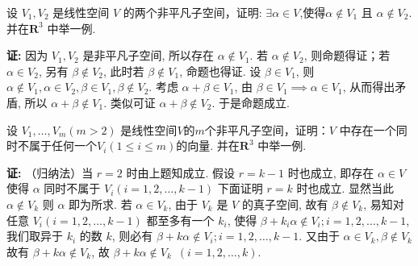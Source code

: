 \begin{exercise}
\begin{exgroup}
        \item 设 $V_1,V_2$ 是线性空间 $V$ 的两个非平凡子空间，证明: $\exists \alpha \in V$,使得$\alpha \notin V_1$ 且 $\alpha \notin V_2$. 并在$\mathbf{R}^3$ 中举一例.
        \begin{answer}
            \textbf{证:} 因为 $V_1, V_2$ 是非平凡子空间, 所以存在 $\alpha \notin V_1$. 若 $\alpha \notin V_2$, 则命题得证；若 $\alpha \in V_2$, 另有 $\beta \notin V_2$, 此时若 $\beta \notin V_1$, 命题也得证. 设 $\beta \in V_1$, 则 $\alpha \notin V_1, \alpha \in V_2, \beta \in V_1, \beta \notin V_2$.
            考虑 $\alpha + \beta \in V_1$, 由 $\beta \in V_1 \implies \alpha \in V_1$, 从而得出矛盾, 所以 $\alpha + \beta \notin V_1$. 类似可证 $\alpha + \beta \notin V_2$. 于是命题成立.
        \end{answer}
        \item 设 $V_1,\ldots,V_m (m > 2)$ 是线性空间$V$的$m$个非平凡子空间，证明：$V$ 中存在一个同时不属于任何一个$V_i(1 \leqslant i \leqslant m)$的向量. 并在$\mathbf{R}^3$ 中举一例.
        \begin{answer}\label{eg:4:A:5}
          \textbf{证:} （归纳法）当 $r=2$ 时由上题知成立.
          假设 $r = k-1$ 时也成立, 即存在 $\alpha \in V$
          使得 $\alpha$ 同时不属于 $V_i (i=1,2,\ldots,k-1)$
          下面证明 $r=k$ 时也成立. 显然当此 $\alpha \notin V_k$ 则 $\alpha$ 即为所求.
           若 $\alpha \in V_k$, 由于 $V_k$ 是 $V$ 的真子空间, 故有 $\beta \notin V_k$, 易知对任意 $V_i (i=1,2,\ldots,k-1)$ 都至多有一个 $k_i$, 使得 $\beta + k_i \alpha \notin V_i; i=1,2,\ldots,k-1$, 我们取异于 $k_i$ 的数 $k$, 则必有 $\beta + k \alpha \notin V_i; i=1,2,\ldots,k-1$. 又由于 $\alpha \in V_k, \beta \notin V_k$ 故有 $\beta + k \alpha \notin V_k$, 故 $\beta + k \alpha \notin V_k \enspace (i = 1,2,\ldots,k)$.
        \end{answer}
    \end{exgroup}


\end{exercise}
